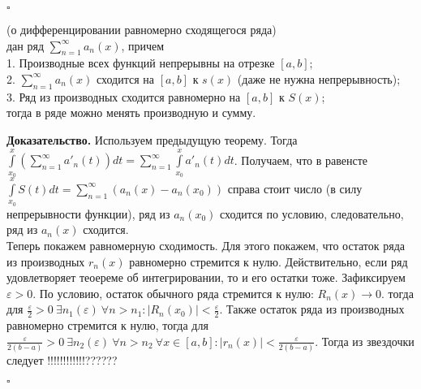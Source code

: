$\square$ 
\begin{theor}
(о дифференцировании равномерно сходящегося ряда)\\
 дан ряд $\sum\limits_{n=1}^{\infty} a_n(x)$, причем \\
 1. Производные всех функций непрерывны на отрезке $[a,b];$\\
 2. $\sum\limits_{n=1}^{\infty} a_n(x)$ сходится на $[a,b]$ к $s
 (x)$ (даже не нужна непрерывность);\\
 3. Ряд из производных сходится равномерно на $[a,b]$ к  $S(x)$;\\
 тогда в ряде  можно менять производную и сумму.
\end{theor}
\textbf{Доказательство.}  Используем предыдущую теорему. Тогда
$\int\limits_{x_0}^x\left( \sum\limits_{n=1}^{\infty} a'_n(t) \right)dt=
\sum\limits_{n=1}^{\infty} \int\limits_{x_0}^xa'_n(t)dt$. Получаем, что 
в равенсте $\int\limits_{x_0}^xS(t)dt=\sum\limits_{n=1}^{\infty} (a_n(x)-a_n
(x_0))$ справа стоит число (в силу непрерывности функции), ряд из $a_n(x_0)$
сходится по условию, следовательно, ряд из $a_n(x)$ сходится.\\
Теперь покажем равномерную сходимость. Для этого покажем, что остаток
ряда из производных $r_n(x)$ равномерно стремится к нулю. Действительно,
если ряд удовлетворяет теоереме об интегрировании, то и его остатки тоже.
Зафиксируем $\varepsilon>0$. По условию, остаток обычного ряда стремится
к нулю: $R_n(x)\to0$. тогда для $\frac{\varepsilon}{2}>0~\exists n_1
(\varepsilon)~\forall n>n_1:|R_n(x_0)|<\frac{\varepsilon}{2}$. 
Также остаток ряда из производных равномерно стремится к нулю, тогда
для $\frac{\varepsilon}{2(b-a)}>0~\exists n_2(\varepsilon)~\forall n>n_2~
\forall x\in[a,b]:|r_n(x)|<\frac{\varepsilon}{2(b-a)}$.
Тогда из звездочки следует !!!!!!!!!!!!??????


 $\square$ 


